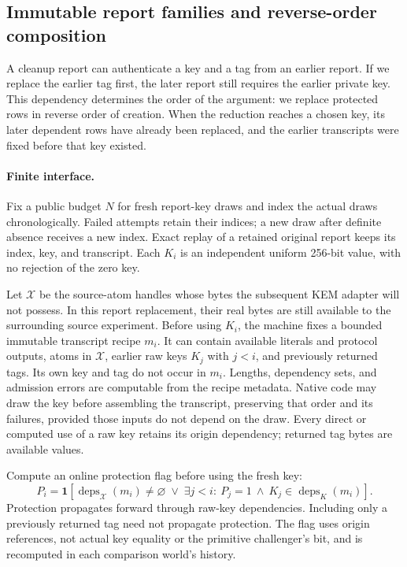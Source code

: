 \subsection{Immutable report families and reverse-order composition}
\label{sec:report-composition}

A cleanup report can authenticate a key and a tag from an earlier
report. If we replace the earlier tag first, the later report still
requires the earlier private key. This dependency determines the order
of the argument: we replace protected rows in reverse order of creation.
When the reduction reaches a chosen key, its later dependent rows have
already been replaced, and the earlier transcripts were fixed before
that key existed.

\paragraph{Finite interface.}
Fix a public budget $N$ for fresh report-key draws and index the actual draws
chronologically.  Failed attempts retain their indices; a new draw after
definite absence receives a new index.  Exact replay of a retained original
report keeps its index, key, and transcript.  Each $K_i$ is an independent
uniform 256-bit value, with no rejection of the zero key.

Let $\mathcal X$ be the source-atom handles whose bytes the subsequent KEM
adapter will not possess.  In this report replacement, their real bytes are
still available to the surrounding source experiment.  Before using $K_i$, the
machine fixes a bounded immutable transcript recipe $m_i$.  It can contain
available literals and protocol outputs, atoms in $\mathcal X$, earlier raw
keys $K_j$ with $j<i$, and previously returned tags.  Its own key and tag do not
occur in $m_i$.  Lengths, dependency sets, and admission errors are computable
from the recipe metadata.  Native code may draw the key before assembling the
transcript, preserving that order and its failures, provided those inputs do
not depend on the draw.  Every direct or computed use of a raw key retains its
origin dependency; returned tag bytes are available values.

Compute an online protection flag before using the fresh key:
\begin{equation}
 P_i=\mathbf 1\!\left[
 \operatorname{deps}_{\mathcal X}(m_i)\ne\varnothing
 \;\lor\;
 \exists j<i:\ P_j=1\ \land\ K_j\in\operatorname{deps}_{K}(m_i)
 \right].
 \label{eq:report-protection}
\end{equation}
Protection propagates forward through raw-key dependencies. Including only
a previously returned tag need not propagate protection. The flag uses origin references, not
actual key equality or the primitive challenger's bit, and is recomputed in
each comparison world's history.

